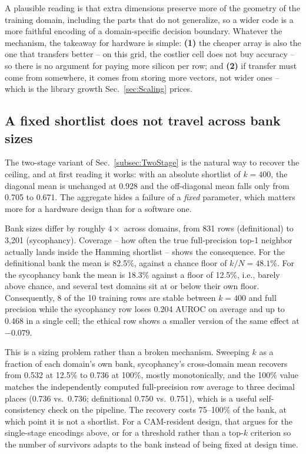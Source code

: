 \documentclass[conference]{IEEEtran}
\newcommand{\cam}{{CAM}\xspace}
\newcommand{\auroc}{{AUROC}\xspace}
\begin{document}
A plausible reading is that extra dimensions preserve more of the
geometry of the training domain, including the parts that do not
generalize, so a wider code is a more faithful encoding of a
domain-specific decision boundary. Whatever the mechanism, the
takeaway for hardware is simple: {\bf (1)} the cheaper array is also
the one that transfers better -- on this grid, the costlier cell does
not buy accuracy -- so there is no argument for
paying more silicon per row; and {\bf (2)} if transfer must come from
somewhere, it comes from storing more vectors, not wider ones --
which is the library growth Sec.~\ref{sec:Scaling} prices.

\subsection{A fixed shortlist does not travel across bank sizes}
\label{subsec:Shortlist}
The two-stage variant of Sec.~\ref{subsec:TwoStage} is the natural way
to recover the ceiling, and at first reading it works: with an absolute
shortlist of $k=400$, the diagonal mean is unchanged at 0.928 and the
off-diagonal mean falls only from 0.705 to 0.671. The aggregate hides a
failure of a \emph{fixed} parameter, which matters more for a hardware
design than for a software one.

Bank sizes differ by roughly $4\times$ across domains, from 831 rows
(definitional) to 3{,}201 (sycophancy). Coverage -- how often the true
full-precision top-1 neighbor actually lands inside the Hamming
shortlist -- shows the consequence. For the definitional bank
the mean is 82.5\%, against a chance floor of $k/N = 48.1\%$. For the
sycophancy bank the mean is 18.3\% against a floor of 12.5\%, i.e.,
barely above chance, and several test domains sit at or below their own
floor. Consequently, 8 of the 10 training rows are stable between $k=400$
and full precision while the sycophancy row loses 0.204 \auroc on
average and up to 0.468 in a single cell; the ethical row shows a smaller
version of the same effect at $-0.079$.

This is a sizing problem rather than a broken mechanism. Sweeping $k$ as a fraction of each domain's own bank,
sycophancy's cross-domain mean recovers from 0.532 at 12.5\% to 0.736 at
100\%, mostly monotonically, and the 100\% value matches the
independently computed full-precision row average to three decimal places
(0.736 vs.\ 0.736; definitional 0.750 vs.\ 0.751), which is a useful
self-consistency check on the pipeline. The recovery costs 75--100\% of
the bank, at which point it is not a shortlist. For a \cam-resident
design, that argues for the single-stage encodings above, or for a
threshold rather than a top-$k$ criterion so the number of survivors
adapts to the bank instead of being fixed at design time.
\end{document}
